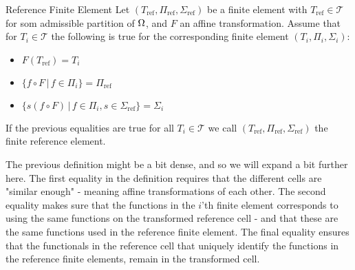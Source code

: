 \iffalse \begin{defn}{Affine Family}
    A family of finite element spaces $S_h$ for partitions $\mathcal{T}_h$ of 
    $\OO\subset \RR^d$ is called an affine family if there exists a finite reference
    element $(T_{\text{ref}}, \Pi_{\text{ref}},\Sigma)$, such that, beside the 
    usual properties of a finite element, there exists some affine mappings 
    $F_j:T_{\text{ref}}\to T_j$ such that
    \begin{equation*}
        \forall v \in S_h \,\,\land \,\, \forall x \in T_j:\,\, v(x) = p(F^{-1}_j(x)) \quad 
        p \in \Pi_{\text{ref}}.
    \end{equation*}
    Meaning, when restricting $v\in S_h$ to some $T_j$, we can fully describe 
    $v$ using some affine mapping and an element in $\Pi_{\text{ref}}$.
\end{defn}
\fi
\begin{defn}{Reference Finite Element} 
    Let $(T_{\text{ref}}, \Pi_{\text{ref}},\Sigma_{\text{ref}})$ be a finite element 
    with $T_{\text{ref}}\in \mathcal{T}$ for som admissible partition of 
    $\Omega$, and 
    $F$ an affine transformation. 
    Assume that for $T_i\in\mathcal{T}$ the following 
    is true for the corresponding finite element $(T_i, \Pi_i,\Sigma_i)$:
    \begin{itemize}
        \item $F(T_{\text{ref}}) = T_i$
        \item $\{ f\circ F \,|\,  f \in \Pi_i \} =\Pi_{\text{ref}}  $
        \item $\{ s(f\circ F) \,|\, f \in \Pi_i, s \in \Sigma_{\text{ref}} \} = \Sigma_i$
    \end{itemize}
    If the previous equalities are true for all $T_i\in \mathcal{T}$ we call 
    $(T_{\text{ref}}, \Pi_{\text{ref}},\Sigma_{\text{ref}})$ the finite reference 
    element.
\end{defn}
The previous definition might be a bit dense, and so we will expand a bit 
further here. The first equality in the definition requires that the 
different cells are "similar enough" - meaning affine transformations of 
each other. The second equality makes sure 
that the functions in the $i$'th finite element corresponds 
to using the same  
functions on the transformed reference cell - and that these are the 
same functions used in the reference finite element.
The final equality ensures that the functionals in the reference cell that 
uniquely identify the functions in the reference finite elements, 
remain in the transformed cell.